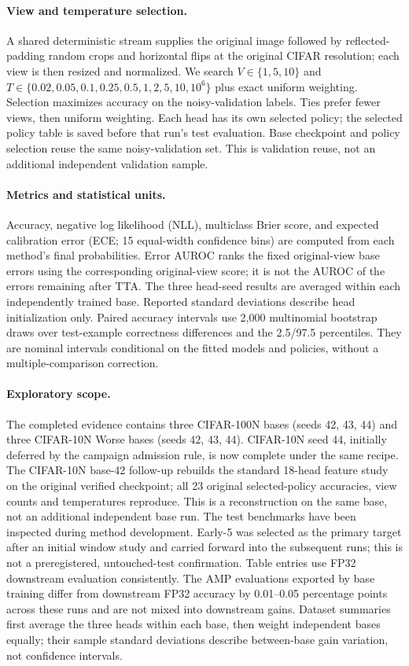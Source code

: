 \paragraph{View and temperature selection.}
A shared deterministic stream supplies the original image followed by reflected-padding random crops and horizontal flips at the original CIFAR resolution; each view is then resized and normalized. We search $V\in\{1,5,10\}$ and $T\in\{0.02,0.05,0.1,0.25,0.5,1,2,5,10,10^6\}$ plus exact uniform weighting. Selection maximizes accuracy on the noisy-validation labels. Ties prefer fewer views, then uniform weighting. Each head has its own selected policy; the selected policy table is saved before that run's test evaluation. Base checkpoint and policy selection reuse the same noisy-validation set. This is validation reuse, not an additional independent validation sample.

\paragraph{Metrics and statistical units.}
Accuracy, negative log likelihood (NLL), multiclass Brier score, and expected calibration error (ECE; 15 equal-width confidence bins) are computed from each method's final probabilities. Error AUROC ranks the fixed original-view base errors using the corresponding original-view score; it is not the AUROC of the errors remaining after TTA. The three head-seed results are averaged within each independently trained base. Reported standard deviations describe head initialization only. Paired accuracy intervals use 2,000 multinomial bootstrap draws over test-example correctness differences and the 2.5/97.5 percentiles. They are nominal intervals conditional on the fitted models and policies, without a multiple-comparison correction.

\paragraph{Exploratory scope.}
The completed evidence contains three CIFAR-100N bases (seeds 42, 43, 44) and three CIFAR-10N Worse bases (seeds 42, 43, 44). CIFAR-10N seed 44, initially deferred by the campaign admission rule, is now complete under the same recipe. The CIFAR-10N base-42 follow-up rebuilds the standard 18-head feature study on the original verified checkpoint; all 23 original selected-policy accuracies, view counts and temperatures reproduce. This is a reconstruction on the same base, not an additional independent base run. The test benchmarks have been inspected during method development. Early-5 was selected as the primary target after an initial window study and carried forward into the subsequent runs; this is not a preregistered, untouched-test confirmation. Table entries use FP32 downstream evaluation consistently. The AMP evaluations exported by base training differ from downstream FP32 accuracy by 0.01--0.05 percentage points across these runs and are not mixed into downstream gains. Dataset summaries first average the three heads within each base, then weight independent bases equally; their sample standard deviations describe between-base gain variation, not confidence intervals.

